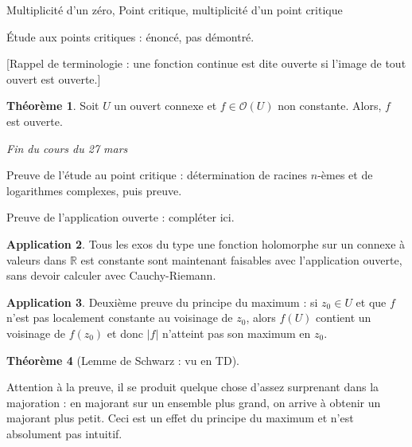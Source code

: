 \documentclass[11pt,a4paper]{book}
\newcommand{\R}{\mathbb{R}}
\theoremstyle{definition}
\newtheorem{theoreme}{Th\'eor\`eme}[section]
\newtheorem{application}[theoreme]{Application}
\theoremstyle{plain}
\begin{document}

Multiplicité d'un zéro, 
Point critique, multiplicité d'un point critique

Étude aux points critiques : énoncé, pas démontré.

[Rappel de terminologie : une fonction continue est dite ouverte si l'image de tout ouvert est ouverte.]

\begin{theoreme}
Soit $U$ un ouvert connexe et $f\in \mathcal O(U)$ non constante.
Alors, $f$ est ouverte.
\end{theoreme}

\begin{center}
\hrulefill \emph{Fin du cours du 27 mars} \hrulefill
\end{center}

Preuve de l'étude au point critique : détermination de racines $n$-èmes et de logarithmes complexes, puis preuve.

Preuve de l'application ouverte : compléter ici.



\begin{application}
Tous les exos du type \og une fonction holomorphe sur un connexe à valeurs dans $\R$ est constante\fg{} sont maintenant faisables avec l'application ouverte, sans devoir calculer avec Cauchy-Riemann.
\end{application}

\begin{application}
Deuxième preuve du principe du maximum : si $z_0 \in U$ et que $f$ n'est pas localement constante au voisinage de $z_0$, alors $f(U)$ contient un voisinage de $f(z_0)$ et donc $|f|$ n'atteint pas son maximum en $z_0$.
\end{application}


\begin{theoreme}[Lemme de Schwarz : vu en TD]
\end{theoreme}

Attention à la preuve, il se produit quelque chose d'assez surprenant dans la majoration : en majorant sur un ensemble plus grand,  on arrive à obtenir un majorant plus petit. Ceci est un effet du principe du maximum et n'est absolument pas intuitif.
\end{document}
